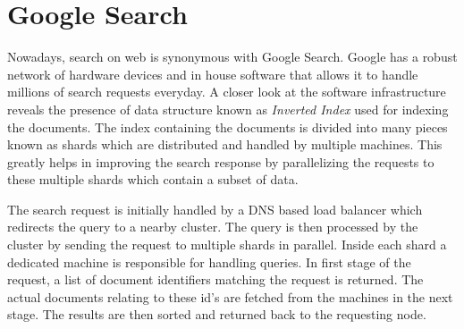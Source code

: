 \documentclass[a4paper,11pt]{kth-mag}
\begin{document}
\section{Google Search}
Nowadays, search on web is synonymous with Google Search. Google has a robust network of hardware devices and in house software that allows it to handle millions of search requests everyday. A closer look at the software infrastructure \cite{googleArchitecture} reveals the presence of data structure known as \textit{Inverted Index} used for indexing the documents. The index containing the documents is divided into many pieces known as shards which are distributed and handled by multiple machines. This greatly helps in improving the search response by parallelizing the requests to these multiple shards which contain a subset of data.
\par The search request is initially handled by a DNS based load balancer which redirects the query to a nearby cluster. The query is then processed by the cluster by sending the request to multiple shards in parallel. Inside each shard a dedicated machine is responsible for handling queries. In first stage of the request, a list of document identifiers matching the request is returned. The actual documents relating to these id's are fetched from the machines in the next stage. The results are then sorted and returned back to the requesting node.
\end{document}
